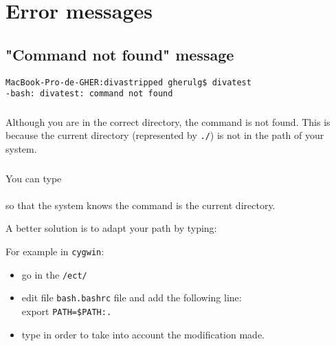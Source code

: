 \section{Error messages}



\subsection{"Command not found" message}

\begin{lstlisting}[style=Bash]
MacBook-Pro-de-GHER:divastripped gherulg$ divatest
-bash: divatest: command not found
\end{lstlisting}


\subsubsection{\question}

Although you are in the correct directory, the command is not found. This is because the current directory (represented by \texttt{./}) is not in the path of your system. 

\subsubsection{\answer}

You can type \\
\\
so that the system knows the command is the current directory.

A better solution is to adapt your path by typing:\\

For example in \texttt{cygwin}:\\
\begin{itemize}
\item go in the \texttt{/ect/}
\item edit file \texttt{bash.bashrc} file
and add the following line:\\
export \texttt{PATH=\$PATH:.}
\item type  in order to take into account the modification made.
\end{itemize}


